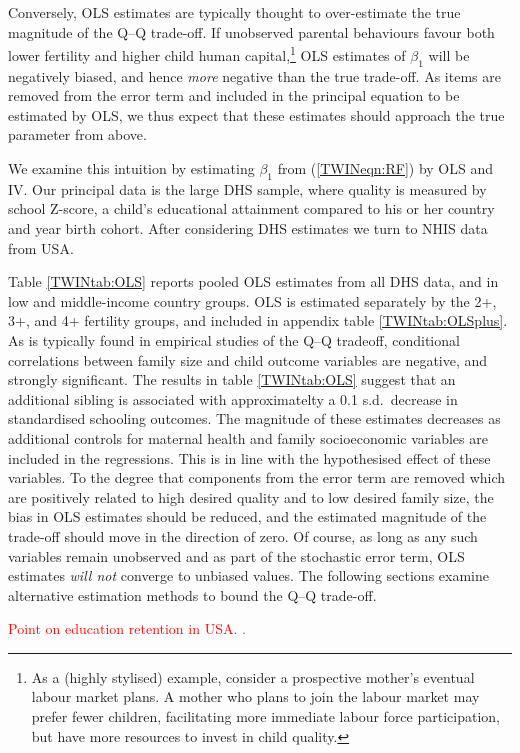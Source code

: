 \documentclass[subeqn]{article}
\begin{document}
\begin{spacing}{1.4}
Conversely, OLS estimates are typically thought to over-estimate the true 
magnitude of the Q--Q trade-off.  If unobserved parental behaviours favour both
lower fertility and higher child human capital,\footnote{As a (highly stylised) 
example, consider a prospective mother's eventual labour market plans. A mother 
who plans to join the labour market may prefer fewer children, facilitating more 
immediate labour force participation, but have more resources to invest in child
quality.} OLS estimates of $\beta_1$ will be negatively biased, and hence 
\emph{more} negative than the true trade-off.  As items are removed from the
error term and included in the principal equation to be estimated by OLS, we thus 
expect that these estimates should approach the true parameter from above.

We examine this intuition by estimating $\beta_1$ from (\ref{TWINeqn:RF}) by OLS 
and IV. Our principal data is the large DHS sample, where quality is measured by
school Z-score, a child's educational attainment compared to his or her 
country and year birth cohort.  After considering DHS estimates we turn to 
NHIS data from USA.

Table \ref{TWINtab:OLS} reports pooled OLS estimates from all DHS data, and in 
low and middle-income country groups. OLS is estimated separately by the 2+, 3+,
and 4+ fertility groups, and included in appendix table \ref{TWINtab:OLSplus}.
As is typically found in empirical studies of the Q--Q tradeoff, conditional 
correlations between family size and child outcome variables are negative, and 
strongly significant.  The results in table \ref{TWINtab:OLS} suggest that an 
additional sibling is associated with approximatelty a 0.1 s.d.\ decrease in 
standardised schooling outcomes.  The magnitude of these estimates decreases
as additional controls for maternal health and family socioeconomic variables
are included in the regressions. This is in line with the hypothesised effect
of these variables.  To the degree that components from the error term are 
removed which are positively related to high desired quality and to low desired 
family size, the bias in OLS estimates should be reduced, and the estimated 
magnitude of the trade-off should move in the direction of zero. Of course, as 
long as any such variables remain unobserved and as part of the stochastic error 
term, OLS estimates \emph{will not} converge to unbiased values.  The following 
sections examine alternative estimation methods to bound the Q--Q trade-off.

\textcolor{red}{Point on education retention in USA. \citet{Warrenetal2014}.}


\end{spacing}
\end{document}
